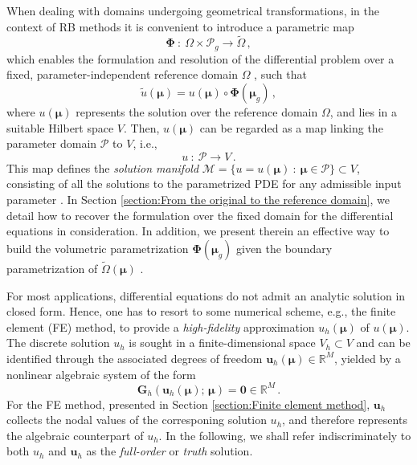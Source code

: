 \documentclass[12pt, a4paper, twoside, openright, notitlepage]{report}
\numberwithin{equation}{chapter}
\theoremstyle{theorem}
\theoremstyle{definition}
\theoremstyle{remark}
\theoremstyle{proposition}
\numberwithin{figure}{chapter}
\newcommand{\wt}[1]{\widetilde{#1}}
\begin{document}
		When dealing with domains undergoing geometrical transformations, in the context of RB methods it is convenient to introduce a parametric map 
		\begin{equation*}
			\label{eq:geometric-map}
			\boldsymbol{\Phi} ~ : ~ \Omega \times \mathcal{P}_g \rightarrow \wt{\Omega} \, ,
		\end{equation*}
		which enables the formulation and resolution of the differential problem over a fixed, parameter-independent reference domain $\Omega$ \cite{MN16}, such that 
		\begin{equation*}
			\wt{u}(\boldsymbol{\mu}) = u(\boldsymbol{\mu}) \circ \boldsymbol{\Phi}(\boldsymbol{\mu}_g) \, ,
		\end{equation*}
		where $u(\boldsymbol{\mu})$ represents the solution over the reference domain $\Omega$, and lies in a suitable Hilbert space $V$. Then, $u(\boldsymbol{\mu})$ can be regarded as a map linking the parameter domain $\mathcal{P}$ to $V$, i.e.,
		\begin{equation*}
			\label{eq:map-continuous}
			u ~ : ~ \mathcal{P} \rightarrow V \, .
		\end{equation*}
		This map defines the \emph{solution manifold} $\mathcal{M} = \big\lbrace u = u(\boldsymbol{\mu}) ~ : ~ \boldsymbol{\mu} \in \mathcal{P} \big\rbrace \subset V$, consisting of all the solutions to the parametrized PDE for any admissible input parameter \cite{HSR16}. In Section \ref{section:From the original to the reference domain}, we detail how to recover the formulation over the fixed domain for the differential equations in consideration. In addition, we present therein an effective way to build the volumetric parametrization $\boldsymbol{\Phi}(\boldsymbol{\mu}_g)$ given the boundary parametrization of $\wt{\Omega}(\boldsymbol{\mu})$ \cite{JIR14}.
		 
		For most applications, differential equations do not admit an analytic solution in closed form. Hence, one has to resort to some numerical scheme, e.g., the finite element (FE) method, to provide a \emph{high-fidelity} approximation $u_h(\boldsymbol{\mu})$ of $u(\boldsymbol{\mu})$. The discrete solution $u_h$ is sought in a finite-dimensional space $V_h \subset V$ and can be identified through the associated degrees of freedom $\mathbf{u}_h(\boldsymbol{\mu}) \in \mathbb{R}^M$, yielded by a nonlinear algebraic system of the form
		\begin{equation}
			\label{eq:nonlinear-system-full}
			\mathbf{G}_h(\mathbf{u}_h(\boldsymbol{\mu}); \, \boldsymbol{\mu}) = \boldsymbol{0} \in \mathbb{R}^M \, .
		\end{equation}
		For the FE method, presented in Section \ref{section:Finite element method}, $\mathbf{u}_h$ collects the nodal values of the corresponing solution $u_h$, and therefore represents the algebraic counterpart of $u_h$. In the following, we shall refer indiscriminately to both $u_h$ and $\mathbf{u}_h$ as the \emph{full-order} or \emph{truth} solution.
		
\end{document}
